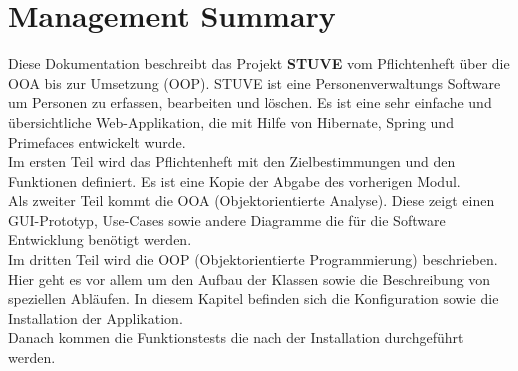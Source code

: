 \section{Management Summary}
Diese Dokumentation beschreibt das Projekt \textbf{STUVE} vom Pflichtenheft über die OOA bis zur Umsetzung (OOP). STUVE ist eine Personenverwaltungs Software um Personen zu erfassen, bearbeiten und löschen. Es ist eine sehr einfache und übersichtliche Web-Applikation, die mit Hilfe von Hibernate, Spring und Primefaces entwickelt wurde.\\
%
Im ersten Teil wird das Pflichtenheft mit den Zielbestimmungen und den Funktionen definiert. Es ist eine Kopie der Abgabe des vorherigen Modul.\\[2ex]
%
Als zweiter Teil kommt die OOA (Objektorientierte Analyse). Diese zeigt einen GUI-Prototyp, Use-Cases sowie andere Diagramme die für die Software Entwicklung benötigt werden.\\[2ex]
%
Im dritten Teil wird die OOP (Objektorientierte Programmierung) beschrieben. Hier geht es vor allem um den Aufbau der Klassen sowie die Beschreibung von speziellen Abläufen. In diesem Kapitel befinden sich die Konfiguration sowie die Installation der Applikation.\\[2ex]
%
Danach kommen die Funktionstests die nach der Installation durchgeführt werden.\\
\newpage
